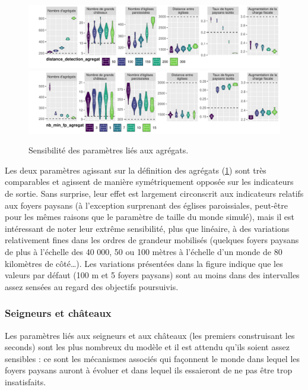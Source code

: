 \begin{figure}[H]
	\centering
	\includegraphics[width=\linewidth]{img/sensib/sensibilite_distance_detection_agregat.pdf}
	\includegraphics[width=\linewidth]{img/sensib/sensibilite_nb_min_fp_agregat.pdf}
	\caption{Sensibilité des paramètres liés aux agrégats.}
	\label{fig:sensib-agregats}
\end{figure}

Les deux paramètres agissant sur la définition des agrégats (\cref{fig:sensib-agregats}) sont très comparables et agissent de manière symétriquement opposée sur les indicateurs de sortie.
Sans surprise, leur effet est largement circonscrit aux indicateurs relatifs aux foyers paysans (à l'exception surprenant des églises paroissiales, peut-être pour les mêmes raisons que le paramètre de taille du monde simulé), mais il est intéressant de noter leur extrême sensibilité, plus que linéaire, à des variations relativement fines dans les ordres de grandeur mobilisés (quelques foyers paysans de plus à l'échelle des 40 000, 50 ou 100 mètres à l'échelle d'un monde de 80 kilomètres de côté\ldots).
Les variations présentées dans la figure indique que les valeurs par défaut (100 m et 5 foyers paysans) sont au moins dans des intervalles assez sensées au regard des objectifs poursuivis.

\subsubsection{Seigneurs et châteaux}

Les paramètres liés aux seigneurs et aux châteaux (les premiers construisant les seconds) sont les plus nombreux du modèle et il est attendu qu'ils soient assez sensibles : ce sont les mécanismes associés qui façonnent le monde dans lequel les foyers paysans auront à évoluer et dans lequel ils essaieront de ne pas être trop insatisfaits.


